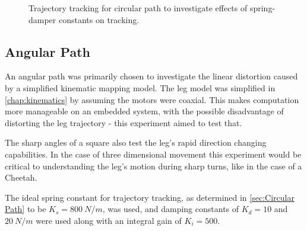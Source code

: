 \begin{figure}
\caption{Trajectory tracking for circular path to investigate effects of spring-damper constants on tracking.}
\label{fig:Trajectory tracking for circular path}
\end{figure}

\subsection{Angular Path}

An angular path was primarily chosen to investigate the linear distortion caused by a simplified kinematic mapping model. The leg model was simplified in \cref{chap:kinematics} by assuming the motors were coaxial. This makes computation more manageable on an embedded system, with the possible disadvantage of distorting the leg trajectory - this experiment aimed to test that.

The sharp angles of a square also test the leg's rapid direction changing capabilities. In the case of three dimensional movement this experiment would be critical to understanding the leg's motion during sharp turns, like in the case of a Cheetah.

The ideal spring constant for trajectory tracking, as determined in \cref{sec:Circular Path} to be $K_s = 800\ N/m$, was used, and damping constants of $K_d = 10$ and $20\ N/m$ were used along with an integral gain of $K_i = 500$.

